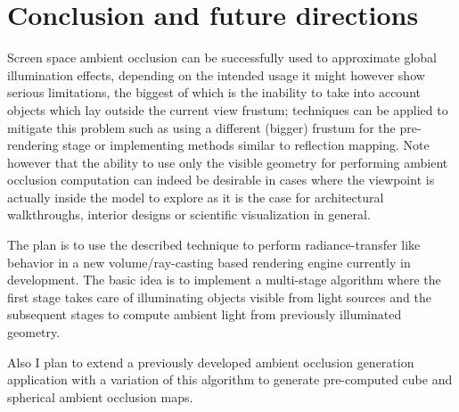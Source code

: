 \documentclass{article}
\begin{document}
\section{Conclusion and future directions}

Screen space ambient occlusion can be successfully used to approximate global illumination effects, depending 
on the intended usage it might however show serious limitations, the biggest of which is the inability to take
into account objects which lay outside the current view frustum; techniques can be applied to
mitigate this problem such as using a different (bigger) frustum for the pre-rendering stage or implementing methods similar to reflection mapping.
Note however that the ability to use only the visible geometry for performing ambient occlusion computation can indeed
be desirable in cases where the viewpoint is actually inside the model to explore as it is the case for architectural
walkthroughs, interior designs or scientific visualization in general. 

The plan is to use the described technique to perform radiance-transfer like behavior in a new volume/ray-casting
based rendering engine currently in development. The basic idea is to implement a  multi-stage algorithm
where the first stage takes care of illuminating objects visible from light sources and the subsequent stages to compute
ambient light from previously illuminated geometry.

Also I plan to extend a previously developed ambient occlusion generation application with a variation of this
algorithm to generate pre-computed cube and spherical ambient occlusion maps.  
\end{document}
